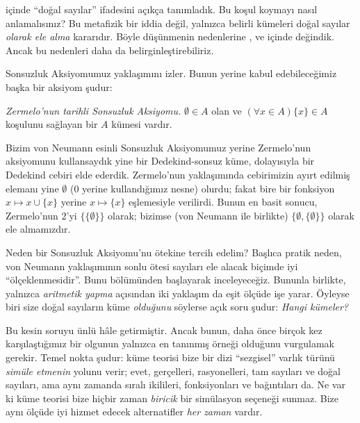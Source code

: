 \documentclass[../../../include/open-logic-section]{subfiles}
\begin{document}
	


 içinde ``doğal sayılar'' ifadesini
açıkça tanımladık. Bu koşul koymayı nasıl anlamalısınız? Bu metafizik bir
iddia değil, yalnızca belirli kümeleri doğal sayılar \emph{olarak ele alma}
kararıdır. Böyle düşünmenin nedenlerine
,  ve
 içinde değindik. Ancak bu
nedenleri daha da belirginleştirebiliriz.

Sonsuzluk Aksiyomumuz \citet{VonNeumann1925} yaklaşımını izler. Bunun
yerine kabul edebileceğimiz başka bir aksiyom şudur:

\begin{defish}
\emph{Zermelo'nun \citeyear{Zermelo1908Untersuchungen} tarihli Sonsuzluk
Aksiyomu.} $\emptyset \in A$ olan ve
$(\forall x \in A)\{x\} \in A$ koşulunu sağlayan bir $A$ kümesi vardır.
\end{defish}

Bizim von Neumann esinli Sonsuzluk Aksiyomumuz yerine Zermelo'nun
aksiyomunu kullansaydık yine bir Dedekind-sonsuz küme, dolayısıyla bir
Dedekind cebiri elde ederdik. Zermelo'nun yaklaşımında cebirimizin ayırt
edilmiş elemanı yine $\emptyset$ ($0$ yerine kullandığımız nesne) olurdu;
fakat bire bir fonksiyon $x\mapsto x\cup\{x\}$ yerine
$x\mapsto\{x\}$ eşlemesiyle verilirdi. Bunun en basit sonucu, Zermelo'nun
$2$'yi $\{\{\emptyset\}\}$ olarak; bizimse (von Neumann ile birlikte)
$\{\emptyset,\{\emptyset\}\}$ olarak ele almamızdır.

Neden bir Sonsuzluk Aksiyomu'nu ötekine tercih edelim? Başlıca pratik
neden, von Neumann yaklaşımının sonlu ötesi sayıları ele alacak biçimde iyi
``ölçeklenmesidir''. Bunu  bölümünden başlayarak
inceleyeceğiz. Bununla birlikte, yalnızca \emph{aritmetik yapma} açısından
iki yaklaşım da eşit ölçüde işe yarar. Öyleyse biri size doğal sayıların
küme \emph{olduğunu} söylerse açık soru şudur: \emph{Hangi kümeler?}

Bu kesin soruyu \citet{Benacerraf1965} ünlü hâle getirmiştir. Ancak bunun,
daha önce birçok kez karşılaştığımız bir olgunun yalnızca en tanınmış örneği
olduğunu vurgulamak gerekir. Temel nokta şudur: küme teorisi bize bir dizi
``sezgisel'' varlık türünü \emph{simüle etmenin} yolunu verir; evet,
gerçelleri, rasyonelleri, tam sayıları ve doğal sayıları, ama aynı zamanda
sıralı ikilileri, fonksiyonları ve bağıntıları da. Ne var ki küme teorisi
bize hiçbir zaman \emph{biricik} bir simülasyon seçeneği sunmaz. Bize aynı
ölçüde iyi hizmet edecek alternatifler \emph{her zaman} vardır.
\end{document}
